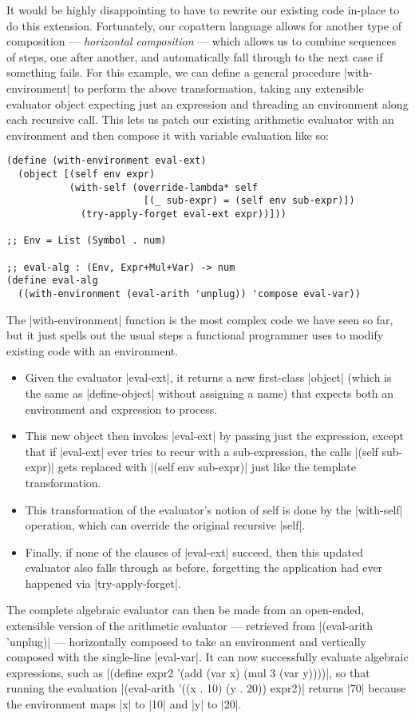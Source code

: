 It would be highly disappointing to have to rewrite our existing code in-place to do this extension.
Fortunately, our copattern language allows for another type of composition --- \emph{horizontal composition} --- which allows us to combine sequences of steps, one after another, and automatically fall through to the next case if something fails.
For this example, we can define a general procedure \scm|with-environment| to perform the above transformation, taking any extensible evaluator object expecting just an expression and threading an environment along each recursive call.
This lets us patch our existing arithmetic evaluator with an environment and then compose it with variable evaluation like so:
\begin{verbatim}
(define (with-environment eval-ext)
  (object [(self env expr)
           (with-self (override-lambda* self
                        [(_ sub-expr) = (self env sub-expr)])
             (try-apply-forget eval-ext expr))]))

;; Env = List (Symbol . num)

;; eval-alg : (Env, Expr+Mul+Var) -> num
(define eval-alg
  ((with-environment (eval-arith 'unplug)) 'compose eval-var))
\end{verbatim}
The \scm|with-environment| function is the most complex code we have seen so far, but it just spells out the usual steps a functional programmer uses to modify existing code with an environment.
\begin{itemize}
\item Given the evaluator \scm|eval-ext|, it returns a new first-class \scm|object| (which is the same as \scm|define-object| without assigning a name) that expects both an environment and expression to process.
\item This new object then invokes \scm|eval-ext| by passing just the expression, except that if \scm|eval-ext| ever tries to recur with a sub-expression, the calls \scm|(self sub-expr)| gets replaced with \scm|(self env sub-expr)| just like the template transformation.
\item This transformation of the evaluator's notion of self is done by the \scm|with-self| operation, which can override the original recursive \scm|self|.
\item Finally, if none of the clauses of \scm|eval-ext| succeed, then this updated evaluator also falls through as before, forgetting the application had ever happened via \scm|try-apply-forget|.
\end{itemize}
The complete algebraic evaluator can then be made from an open-ended, extensible version of the arithmetic evaluator --- retrieved from \scm|(eval-arith 'unplug)| --- horizontally composed to take an environment and vertically composed with the single-line \scm|eval-var|.
It can now successfully evaluate algebraic expressions, such as \scm|(define expr2 '(add (var x) (mul 3 (var y))))|, so that running the evaluation \scm|(eval-arith '((x . 10) (y . 20)) expr2)| returns \scm|70| because the environment maps \scm|x| to \scm|10| and \scm|y| to \scm|20|.

